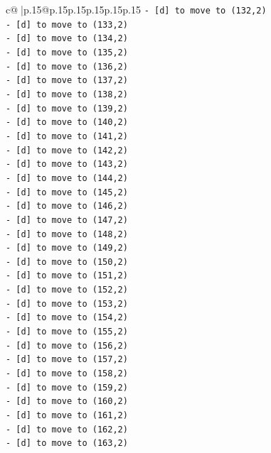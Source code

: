 \documentclass{article}
\begin{document}
{\begin{supertabular}{c@{$\;$}|p{.15\linewidth}@{}p{.15\linewidth}p{.15\linewidth}p{.15\linewidth}p{.15\linewidth}p{.15\linewidth}}
{{{\texttt{{-} {[}d{]} to move to (132,2)} \\
\texttt{{-} {[}d{]} to move to (133,2)} \\
\texttt{{-} {[}d{]} to move to (134,2)} \\
\texttt{{-} {[}d{]} to move to (135,2)} \\
\texttt{{-} {[}d{]} to move to (136,2)} \\
\texttt{{-} {[}d{]} to move to (137,2)} \\
\texttt{{-} {[}d{]} to move to (138,2)} \\
\texttt{{-} {[}d{]} to move to (139,2)} \\
\texttt{{-} {[}d{]} to move to (140,2)} \\
\texttt{{-} {[}d{]} to move to (141,2)} \\
\texttt{{-} {[}d{]} to move to (142,2)} \\
\texttt{{-} {[}d{]} to move to (143,2)} \\
\texttt{{-} {[}d{]} to move to (144,2)} \\
\texttt{{-} {[}d{]} to move to (145,2)} \\
\texttt{{-} {[}d{]} to move to (146,2)} \\
\texttt{{-} {[}d{]} to move to (147,2)} \\
\texttt{{-} {[}d{]} to move to (148,2)} \\
\texttt{{-} {[}d{]} to move to (149,2)} \\
\texttt{{-} {[}d{]} to move to (150,2)} \\
\texttt{{-} {[}d{]} to move to (151,2)} \\
\texttt{{-} {[}d{]} to move to (152,2)} \\
\texttt{{-} {[}d{]} to move to (153,2)} \\
\texttt{{-} {[}d{]} to move to (154,2)} \\
\texttt{{-} {[}d{]} to move to (155,2)} \\
\texttt{{-} {[}d{]} to move to (156,2)} \\
\texttt{{-} {[}d{]} to move to (157,2)} \\
\texttt{{-} {[}d{]} to move to (158,2)} \\
\texttt{{-} {[}d{]} to move to (159,2)} \\
\texttt{{-} {[}d{]} to move to (160,2)} \\
\texttt{{-} {[}d{]} to move to (161,2)} \\
\texttt{{-} {[}d{]} to move to (162,2)} \\
\texttt{{-} {[}d{]} to move to (163,2)} \\
}}}
\end{supertabular}}
\end{document}
